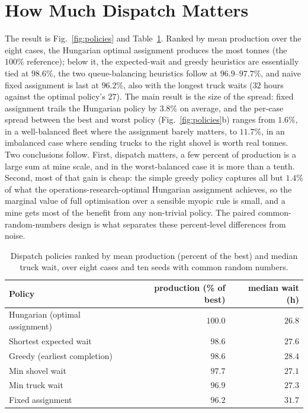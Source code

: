\documentclass[journal]{IEEEtran}
\begin{document}
\section{How Much Dispatch Matters}\label{sec:results}

The result is Fig.~\ref{fig:policies} and Table~\ref{tab:policies}. Ranked by mean production over the eight
cases, the Hungarian optimal assignment produces the most tonnes (the $100\%$ reference); below it, the
expected-wait and greedy heuristics are essentially tied at $98.6\%$, the
two queue-balancing heuristics follow at $96.9$--$97.7\%$, and naive fixed assignment is last at $96.2\%$, also
with the longest truck waits ($32$ hours against the optimal policy's $27$). The main result is the size of the
spread: fixed assignment trails the Hungarian policy by $3.8\%$ on average, and the per-case spread between the
best and worst policy (Fig.~\ref{fig:policies}b) ranges from $1.6\%$, in a well-balanced fleet where the
assignment barely matters, to $11.7\%$, in an imbalanced case where sending trucks to the right shovel is worth
real tonnes. Two conclusions follow. First, dispatch matters, a few percent of production is a large sum at mine scale, and in the
worst-balanced case it is more than a tenth. Second, most of that gain is cheap: the simple greedy policy captures
all but $1.4\%$ of what the operations-research-optimal Hungarian assignment achieves, so the marginal value of
full optimisation over a sensible myopic rule is small, and a mine gets most of the benefit from any non-trivial
policy. The paired common-random-numbers design is what separates these percent-level differences from noise.

\begin{table}[!t]
\centering
\caption{Dispatch policies ranked by mean production (percent of the best) and median truck wait, over eight
cases and ten seeds with common random numbers.}
\label{tab:policies}
\footnotesize
\setlength{\tabcolsep}{4pt}
\begin{tabular}{@{}l r r@{}}
\toprule
Policy & production (\% of best) & median wait (h) \\
\midrule
Hungarian (optimal assignment) & $100.0$ & $26.8$ \\
Shortest expected wait         & $98.6$  & $27.6$ \\
Greedy (earliest completion)   & $98.6$  & $28.4$ \\
Min shovel wait                & $97.7$  & $27.1$ \\
Min truck wait                 & $96.9$  & $27.3$ \\
Fixed assignment               & $96.2$  & $31.7$ \\
\bottomrule
\end{tabular}
\end{table}
\end{document}
